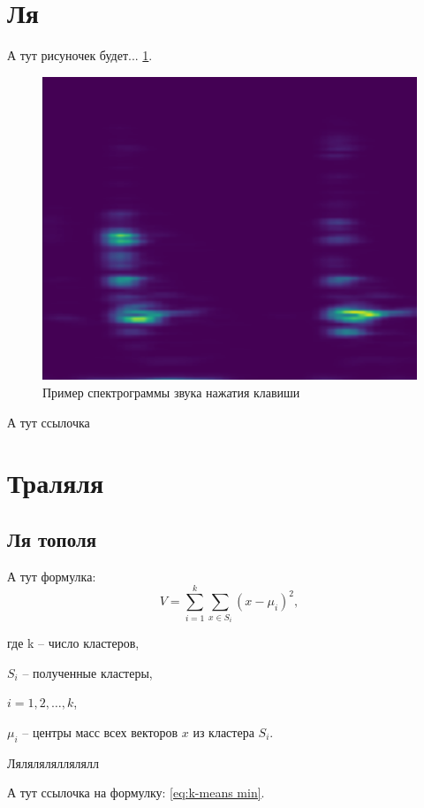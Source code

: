\section{Ля}
\label{section:audio feature extraction} %

А тут рисуночек будет...
\ref{fig:sg_of_key}.

\begin{figure}[ht]
    \centering
    \vspace{0ex}
    \includegraphics[width=0.5\linewidth]{imgs/mel_spec_key.png}
    \caption{Пример спектрограммы звука нажатия клавиши}
    \label{fig:sg_of_key}
\end{figure}

А тут ссылочка \cite{Abdul_Jamil:Speech Emotion Recognition} 


\section{Траляля}

\subsection{Ля тополя}

А тут формулка:
\begin{equation}
V = \sum_{i=1}^{k} \sum_{x \in S_i} (x - \mu_i)^2,
\label{eq:k-means min}
\end{equation}

где k -- число кластеров,

\hspace{1.5em}$S_{i}$ -- полученные кластеры,

\hspace{1.6em}$i=1,2,\dots ,k$,

\hspace{1.5em}$\mu _{i}$ -- центры масс всех векторов $x$ из кластера $S_{i}$.

Ляляляляллялялл

А тут ссылочка на формулку: \ref{eq:k-means min}.

